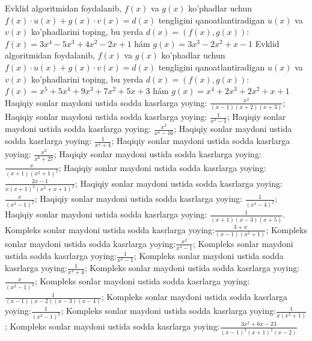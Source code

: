 Evklid algoritmidan foydalanib, $f(x)$ va $g(x)$ ko’phadlar uchun $f(x) \cdot u(x)+g(x) \cdot v(x)=d(x)$ tengligini qanoatlantiradigan $u(x)$ va $v(x)$ ko’phadlarini toping, bu yerda $d(x)=(f(x), g(x))$:  $f(x)=3 x^4-5 x^3+4 x^2-2 x+1$ hám $g(x)=3 x^3-2 x^2+x-1$
Evklid algoritmidan foydalanib, $f(x)$ va $g(x)$ ko’phadlar uchun $f(x) \cdot u(x)+g(x) \cdot v(x)=d(x)$ tengligini qanoatlantiradigan $u(x)$ va $v(x)$ ko’phadlarini toping, bu yerda $d(x)=(f(x), g(x))$:  $f(x)=x^5+5 x^4+9 x^3+7 x^2+5 x+3$ hám $g(x)=x^4+2 x^3+2 x^2+x+1$
Haqiqiy sonlar maydoni ustida sodda kasrlarga yoying:  $\frac{x^2}{(x-1)(x+2)(x+3)}$;
Haqiqiy sonlar maydoni ustida sodda kasrlarga yoying:  $\frac{1}{x^3-1}$;
Haqiqiy sonlar maydoni ustida sodda kasrlarga yoying:  $\frac{x^2}{x^4-16}$;
Haqiqiy sonlar maydoni ustida sodda kasrlarga yoying:  $\frac{1}{x^4+4}$;
Haqiqiy sonlar maydoni ustida sodda kasrlarga yoying:  $\frac{x^2}{x^6+27}$;
Haqiqiy sonlar maydoni ustida sodda kasrlarga yoying:  $\frac{x}{(x+1)\left(x^2+1\right)^2}$;
Haqiqiy sonlar maydoni ustida sodda kasrlarga yoying:  $\frac{2 x-1}{x(x+1)^2\left(x^2+x+1\right)^2}$;
Haqiqiy sonlar maydoni ustida sodda kasrlarga yoying:  $\frac{x}{\left(x^2-1\right)^2}$;
Haqiqiy sonlar maydoni ustida sodda kasrlarga yoying:  $\frac{1}{\left(x^4-4\right)^2}$;
Haqiqiy sonlar maydoni ustida sodda kasrlarga yoying:  $\frac{1}{(x+1)(x-3)(x+5)}$.
Kompleks sonlar maydoni ustida sodda kasrlarga yoying:$\frac{3+x}{(x-1)\left(x^2+1\right)}$;
Kompleks sonlar maydoni ustida sodda kasrlarga yoying:$\frac{x^2}{x^4-1}$;
Kompleks sonlar maydoni ustida sodda kasrlarga yoying:$\frac{1}{x^2-1}$;
Kompleks sonlar maydoni ustida sodda kasrlarga yoying:$\frac{1}{x^4+4}$;
Kompleks sonlar maydoni ustida sodda kasrlarga yoying:$\frac{x}{\left(x^2-1\right)^2}$;
Kompleks sonlar maydoni ustida sodda kasrlarga yoying:$\frac{1}{(x-1)(x-2)(x-3)(x-4)}$;
Kompleks sonlar maydoni ustida sodda kasrlarga yoying:$\frac{1}{\left(x^2-1\right)^2}$;
Kompleks sonlar maydoni ustida sodda kasrlarga yoying:$\frac{1}{x\left(x^2+1\right)}$;
Kompleks sonlar maydoni ustida sodda kasrlarga yoying:$\frac{3 x^2+6 x-23}{(x-1)^3(x+1)^2(x-2)}$